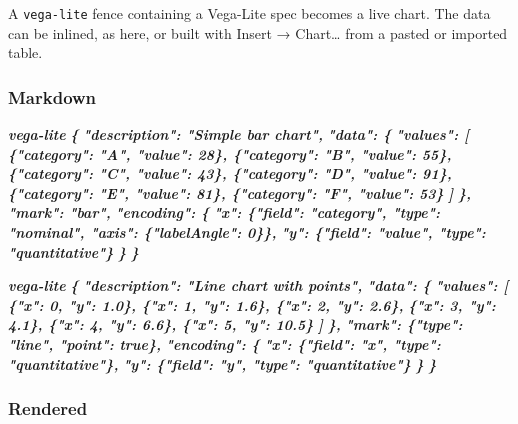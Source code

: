 \documentclass[
]{article}
\newenvironment{Shaded}{}{}
\newcommand{\InformationTok}[1]{\textcolor[rgb]{0.38,0.63,0.69}{\textbf{\textit{#1}}}}
\begin{document}
A \texttt{vega-lite} fence containing a Vega-Lite spec becomes a live
chart. The data can be inlined, as here, or built with Insert →
Chart\ldots{} from a pasted or imported table.

\subsubsection{Markdown}\label{markdown-6}

\begin{Shaded}
\begin{Highlighting}[]
\InformationTok{\textasciigrave{}\textasciigrave{}\textasciigrave{}vega{-}lite}
\InformationTok{\{}
\InformationTok{  "description": "Simple bar chart",}
\InformationTok{  "data": \{}
\InformationTok{    "values": [}
\InformationTok{      \{"category": "A", "value": 28\}, \{"category": "B", "value": 55\},}
\InformationTok{      \{"category": "C", "value": 43\}, \{"category": "D", "value": 91\},}
\InformationTok{      \{"category": "E", "value": 81\}, \{"category": "F", "value": 53\}}
\InformationTok{    ]}
\InformationTok{  \},}
\InformationTok{  "mark": "bar",}
\InformationTok{  "encoding": \{}
\InformationTok{    "x": \{"field": "category", "type": "nominal", "axis": \{"labelAngle": 0\}\},}
\InformationTok{    "y": \{"field": "value", "type": "quantitative"\}}
\InformationTok{  \}}
\InformationTok{\}}
\InformationTok{\textasciigrave{}\textasciigrave{}\textasciigrave{}}

\InformationTok{\textasciigrave{}\textasciigrave{}\textasciigrave{}vega{-}lite}
\InformationTok{\{}
\InformationTok{  "description": "Line chart with points",}
\InformationTok{  "data": \{}
\InformationTok{    "values": [}
\InformationTok{      \{"x": 0, "y": 1.0\}, \{"x": 1, "y": 1.6\}, \{"x": 2, "y": 2.6\},}
\InformationTok{      \{"x": 3, "y": 4.1\}, \{"x": 4, "y": 6.6\}, \{"x": 5, "y": 10.5\}}
\InformationTok{    ]}
\InformationTok{  \},}
\InformationTok{  "mark": \{"type": "line", "point": true\},}
\InformationTok{  "encoding": \{}
\InformationTok{    "x": \{"field": "x", "type": "quantitative"\},}
\InformationTok{    "y": \{"field": "y", "type": "quantitative"\}}
\InformationTok{  \}}
\InformationTok{\}}
\InformationTok{\textasciigrave{}\textasciigrave{}\textasciigrave{}}
\end{Highlighting}
\end{Shaded}

\subsubsection{Rendered}\label{rendered-6}
\end{document}
